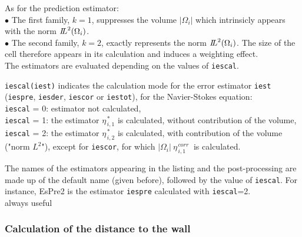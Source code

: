 As for the prediction estimator:\\
\hspace*{0.5cm}$\bullet$ The first family, $k=1$, suppresses the
volume $|\Omega_i|$ which intrinsicly appears  with the norm
${{I\hspace{-.25em}L}^{2}(\Omega_i)}$.\\
\hspace*{0.5cm}$\bullet$ The second family, $k=2$, exactly represents the norm
${{I\hspace{-.25em}L}^{2}(\Omega_i)}$. The size of the cell therefore
appears in its calculation and induces a weighting effect.\\


The estimators are evaluated depending on the values of {\tt iescal}.


{{\tt iescal(iest)} indicates the calculation mode
for the error estimator {\tt iest} ({\tt iespre}, {\tt iesder}, {\tt iescor} or
{\tt iestot}), for
the Navier-Stokes equation:\\
 {\tt iescal} = 0: estimator not calculated, \\
 {\tt iescal} = 1: the estimator $ \eta^{\,* }_{\,i,1}$ is calculated,
                   without contribution of the volume, \\
 {\tt iescal} = 2: the estimator $ \eta^{\,* }_{\,i,2}$ is calculated,
                   with contribution of the volume ("norm $L^2$"),
                   except for {\tt iescor}, for which
                   $|\Omega_i|\ \eta^{\,corr}_{\,i,1}\ $
                   is calculated.

The names of the estimators appearing in the listing and the post-processing are
made up of the default name (given before), followed by the value of
{\tt iescal}. For
instance, EsPre2 is the estimator {\tt iespre} calculated with {\tt iescal}=2.\\
always useful}


\subsubsection{Calculation of the distance to the wall}

